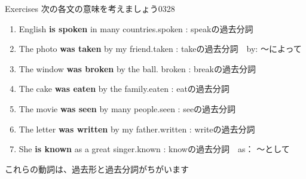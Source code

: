 \documentclass[aspectratio=169,xcolor={dvipsnames,table}]{beamer}
\newcommand{\myaudio}[1]{\href{#1}{\faVolumeUp}}
\begin{document}
\begin{frame}[plain]{Exercises}
 次の各文の意味を考えましょう\hfill{\tiny 0328}\,{\scriptsize \myaudio{./audio/051_passive_03.mp3}}


 \begin{enumerate}
\item English \textbf{is spoken} in many countries.\hfill{}{\scriptsize spoken  : speakの過去分詞}
\item The photo \textbf{was taken} by my friend.\hfill{}{\scriptsize taken  : takeの過去分詞　by: 〜によって}
\item The window \textbf{was broken} by the ball.\hfill{} {\scriptsize broken  : breakの過去分詞}
\item The cake \textbf{was eaten} by the family.\hfill{}{\scriptsize eaten  : eatの過去分詞}
\item The movie \textbf{was seen} by many people.\hfill{}{\scriptsize seen  : seeの過去分詞}
\item The letter \textbf{was written} by my father.\hfill{}{\scriptsize written  : writeの過去分詞}
\item She \textbf{is known} as a great singer.\hfill{}{\scriptsize known  : knowの過去分詞　as： 〜として}
\end{enumerate}

\pause

\hfill{}{\small これらの動詞は、過去形と過去分詞がちがいます}

\end{frame}
\end{document}

